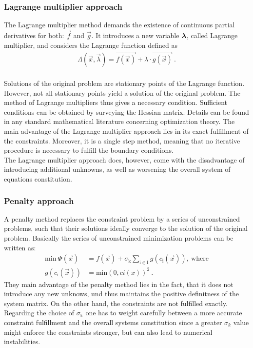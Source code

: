 \subsubsection{Lagrange multiplier approach}\label{sec:lagrange_multiplier_approach}
The Lagrange multiplier method demands the existence of continuous partial derivatives for both: $\vec{f}$ and $\vec{g}$. It introduces a new variable $\boldsymbol{ \mathsf{\lambda} }$, called Lagrange multiplier, and considers the Lagrange function defined as
\begin{align}
  \Lambda(\vec{x},\vec{\lambda})=\vec{f(\vec{x})}+\lambda\cdot\vec{g(\vec{x})}~. 
\end{align}
\\
Solutions of the original problem are stationary points of the Lagrange function. However, not all stationary points yield a solution of the original problem. The method of Lagrange multipliers thus gives a necessary condition. Sufficient conditions can be obtained by surveying the Hessian matrix. Details can be found in any standard mathematical literature concerning optimization theory.
The main advantage of the Lagrange multiplier approach lies in its exact fulfillment of the constraints. Moreover, it is a single step method, meaning that no iterative procedure is necessary to fulfill the boundary conditions.\\
The Lagrange multiplier approach does, however, come with the disadvantage of introducing additional unknowns, as well as worsening the overall system of equations constitution.
\subsubsection{Penalty approach}
A penalty method replaces the constraint problem by a series of unconstrained problems, such that their solutions ideally converge to the solution of the original problem. Basically the series of unconstrained minimization problems can be written as:
\begin{align}
  \text{min}~\Phi(\vec{x}) & =f(\vec{x})+\sigma_\mathrm k \sum_\mathrm {i \in I} g(c_\mathrm i(\vec{x})),~\text{where} \\
  g(c_\mathrm i(\vec{x}))  & = \text{min}(0,ci(x))^2~.                                                                 
\end{align}
They main advantage of the penalty method lies in the fact, that it does not introduce any new unknows, und thus maintains the positive definitness of the system matrix. On the other hand, the constraints are not fulfilled exactly. Regarding the choice of $\sigma_\mathrm k$ one has to weight carefully between a more accurate constraint fulfillment and the overall systems constitution since a greater $\sigma_k$ value might enforce the constraints stronger, but can also lead to numerical instabilities.
